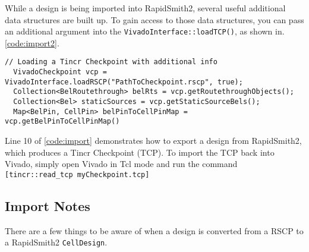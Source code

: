 \vspace{.3cm}
\noindent
While a design is being imported into RapidSmith2, several useful additional
data structures are built up. To gain access to those data structures, you can pass
an additional argument into the \texttt{VivadoInterface::loadTCP()}, as shown in.
\autoref{code:import2}.

\begin{lstlisting}[xleftmargin=1.5em, framexleftmargin=1.5em, caption=Importing
a TCP with additional information, label=code:import2]
  // Loading a Tincr Checkpoint with additional info
  VivadoCheckpoint vcp = VivadoInterface.loadRSCP("PathToCheckpoint.rscp", true); 
  Collection<BelRoutethrough> belRts = vcp.getRoutethroughObjects();
  Collection<Bel> staticSources = vcp.getStaticSourceBels();
  Map<BelPin, CellPin> belPinToCellPinMap = vcp.getBelPinToCellPinMap()
\end{lstlisting}

\vspace{.3cm}
\noindent
Line 10 of \autoref{code:import} demonstrates how to export a design from
RapidSmith2, which produces a Tincr Checkpoint (TCP). To import the TCP back
into Vivado, simply open Vivado in Tcl mode and run the command
\texttt{[tincr::read\-\_tcp myCheckpoint.tcp]}

\subsection{Import Notes}
There are a few things to be aware of when a design is converted from a RSCP to
a RapidSmith2 \texttt{CellDesign}. 

